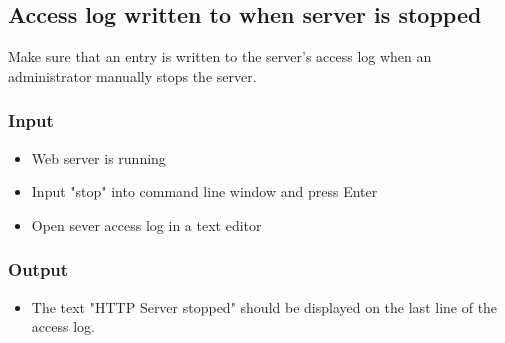 \documentclass[a4paper, 12pt]{article}
\begin{document}
\subsection{Access log written to when server is stopped}

Make sure that an entry is written to the server's access log when an administrator manually stops the server.

\subsubsection{Input}
\begin{itemize}
\item Web server is running
\item Input "stop" into command line window and press Enter
\item Open sever access log in a text editor
\end{itemize}

\subsubsection{Output}
\begin{itemize}
\item The text "HTTP Server stopped" should be displayed on the last line of the access log.
\end{itemize}
\end{document}
